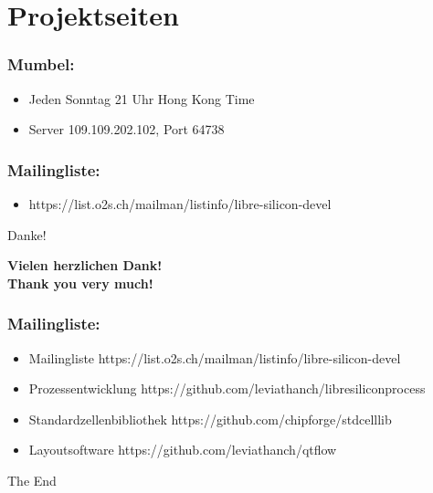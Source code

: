 \documentclass{beamer}
\begin{document}
\section{Projektseiten}

\begin{frame}
\frametitle{Mumbel:}
\begin{itemize}
\item Jeden Sonntag 21 Uhr Hong Kong Time
\item Server 109.109.202.102, Port 64738
\end{itemize}
\end{frame}


\begin{frame}
\frametitle{Mailingliste:}
\begin{itemize}
\item https://list.o2s.ch/mailman/listinfo/libre-silicon-devel
\end{itemize}
\end{frame}


\begin{frame}{Danke!}
	\begin{center}
		\textbf{Vielen herzlichen Dank!} \\
		\textbf{Thank you very much!} \\
	\end{center}
\end{frame}


\begin{frame}
\frametitle{Mailingliste:}
\begin{itemize}
\item Mailingliste
https://list.o2s.ch/mailman/listinfo/libre-silicon-devel
\item Prozessentwicklung
https://github.com/leviathanch/libresiliconprocess
\item Standardzellenbibliothek
https://github.com/chipforge/stdcelllib
\item Layoutsoftware
https://github.com/leviathanch/qtflow
\end{itemize}
\end{frame}


\begin{frame}
\Huge{\centerline{The End}}
\end{frame}

\end{document}

